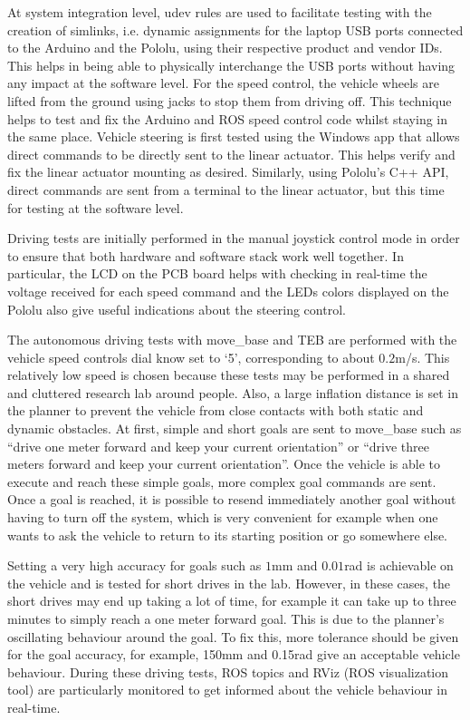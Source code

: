 \documentclass[a4paper]{article}
\begin{document}
	At system integration level, udev rules are used to facilitate testing with the creation of simlinks, i.e. dynamic assignments for the laptop USB ports connected to the Arduino and the Pololu, using their respective product and vendor IDs. This helps in being able to physically interchange the USB ports without having any impact at the software level. For the speed control, the vehicle wheels are lifted from the ground using jacks to stop them from driving off. This technique helps to test and fix the Arduino and ROS speed control code whilst staying in the same place. Vehicle steering is first tested using the Windows app that allows direct commands to be directly sent to the linear actuator. This helps verify and fix the linear actuator mounting as desired. Similarly, using Pololu's C++ API, direct commands are sent from a terminal to the linear actuator, but this time for testing at the software level. 
	
	Driving tests are initially performed in the manual joystick control mode in order to ensure that both hardware and software stack work well together. In particular, the LCD on the PCB board helps with checking in real-time the voltage received for each speed command and the LEDs colors displayed on the Pololu also give useful indications about the steering control. 
	
	The autonomous driving tests with move\_base and TEB are performed with the vehicle speed controls dial know set to `5', corresponding to about $0.2$m/s. This relatively low speed is chosen because these tests may be performed in a shared and cluttered research lab around people. Also, a large inflation distance is set in the planner to prevent the vehicle from close contacts with both static and dynamic obstacles. At first, simple and short goals are sent to move\_base such as ``drive one meter forward and keep your current orientation'' or ``drive three meters forward and keep your current orientation''. Once the vehicle is able to execute and reach these simple goals, more complex goal commands are sent. Once a goal is reached, it is possible to resend immediately another goal without having to turn off the system, which is very convenient for example when one wants to ask the vehicle to return to its starting position or go somewhere else. 
	
	Setting a very high accuracy for goals such as $1$mm and $0.01$rad is achievable on the vehicle and is tested for short drives in the lab. However, in these cases, the short drives may end up taking a lot of time, for example it can take up to three minutes to simply reach a one meter forward goal. This is due to the planner's oscillating behaviour around the goal. To fix this, more tolerance should be given for the goal accuracy, for example, 150mm and 0.15rad give an acceptable vehicle behaviour. During these driving tests, ROS topics and RViz (ROS visualization tool) are particularly monitored to get informed about the vehicle behaviour in real-time. 
	
\end{document}
